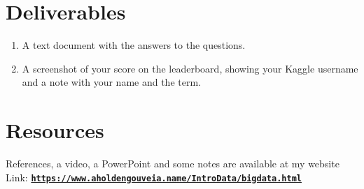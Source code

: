 \documentclass[12pt]{article}
\begin{document}
\section*{Deliverables}
\begin{enumerate}
    \item A text document with the answers to the questions.
    \item A screenshot of your score on the leaderboard, showing your Kaggle username and a note with your name and the term.
\end{enumerate}

\section*{Resources}
References, a video, a PowerPoint and some notes are available at my website
Link: \href{https://www.aholdengouveia.name/IntroData/bigdata.html}{\textbf{\nolinkurl{https://www.aholdengouveia.name/IntroData/bigdata.html}}}
\end{document}

